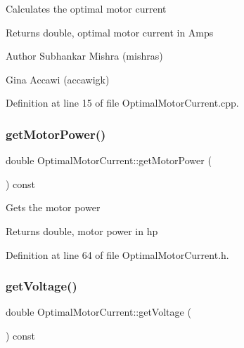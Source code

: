 Calculates the optimal motor current

\begin{DoxyReturn}{Returns}
double, optimal motor current in Amps
\end{DoxyReturn}
\begin{DoxyAuthor}{Author}
Subhankar Mishra (mishras) 

Gina Accawi (accawigk) 
\end{DoxyAuthor}


Definition at line 15 of file Optimal\+Motor\+Current.\+cpp.

\mbox{\label{class_optimal_motor_current_a345ae983be872a2504c50ff8a96b4fc9}} 
\subsubsection{\texorpdfstring{get\+Motor\+Power()}{getMotorPower()}}
{\footnotesize\ttfamily double Optimal\+Motor\+Current\+::get\+Motor\+Power (\begin{DoxyParamCaption}{ }\end{DoxyParamCaption}) const\hspace{0.3cm}{\ttfamily [inline]}}

Gets the motor power

\begin{DoxyReturn}{Returns}
double, motor power in hp 
\end{DoxyReturn}


Definition at line 64 of file Optimal\+Motor\+Current.\+h.

\mbox{\label{class_optimal_motor_current_a4f9b5f8b83287868a72bfeca97713fd3}} 
\subsubsection{\texorpdfstring{get\+Voltage()}{getVoltage()}}
{\footnotesize\ttfamily double Optimal\+Motor\+Current\+::get\+Voltage (\begin{DoxyParamCaption}{ }\end{DoxyParamCaption}) const\hspace{0.3cm}{\ttfamily [inline]}}

